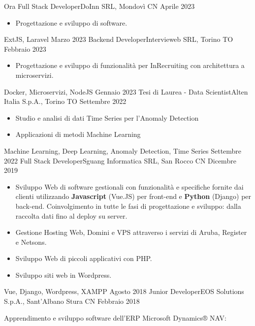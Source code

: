 \begin{experiences}
	\experience
	{Ora}   {Full Stack Developer}{DoInn SRL, Mondovì CN}
	{Aprile 2023} {
		\begin{itemize}
			\item Progettazione e sviluppo di software.
		\end{itemize}
	}
	{ExtJS, Laravel}
	\emptySeparator
	\emptySeparator
	\experience
	{Marzo 2023}   {Backend Developer}{Intervieweb SRL, Torino TO}
	{Febbraio 2023} {
		\begin{itemize}
			\item Progettazione e sviluppo di funzionalità per InRecruiting con architettura a microservizi.
		\end{itemize}
	}
	{Docker, Microservizi, NodeJS}
	\emptySeparator
	\emptySeparator
	\experience
	{Gennaio 2023}   {Tesi di Laurea - Data Scientist}{Alten Italia S.p.A., Torino TO}
	{Settembre 2022} {
		\begin{itemize}
			\item Studio e analisi di dati Time Series per l'Anomaly Detection
			\item Applicazioni di metodi Machine Learning
		\end{itemize}
	}
	{Machine Learning, Deep Learning, Anomaly Detection, Time Series}
	\emptySeparator
	\emptySeparator
	\experience
	{Settembre 2022}   {Full Stack Developer}{Sguang Informatica SRL, San Rocco CN}
	{Dicembre 2019} {
		\begin{itemize}
			\item Sviluppo Web di software gestionali con funzionalità e specifiche fornite dai clienti utilizzando \textbf{Javascript} (Vue.JS) per front-end e \textbf{Python} (Django) per back-end. Coinvolgimento in tutte le fasi di progettazione e sviluppo: dalla raccolta dati fino al deploy su server. 
			\item Gestione Hosting Web, Domini e VPS attraverso i servizi di Aruba, Register e Netsons.
			\item Sviluppo Web di piccoli applicativi con PHP.
			\item Sviluppo siti web in Wordpress.                         
		\end{itemize}
	}
	{Vue, Django, Wordpress, XAMPP}
	\emptySeparator
	\emptySeparator
	\experience
	{Agosto 2018} {Junior Developer}{EOS Solutions S.p.A., Sant'Albano Stura CN}
	{Febbraio 2018}    {
		Apprendimento e sviluppo software dell'ERP Microsoft Dynamics® NAV:
		\begin{itemize}

\end{itemize}}
\end{experiences}
